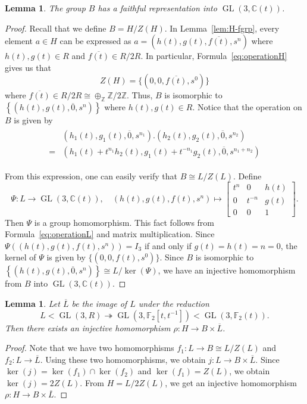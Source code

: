 \documentclass[11pt]{amsart}
\newtheorem{lem}[thm]{Lemma}
\theoremstyle{definition}
\DeclareMathOperator{\GL}{GL}
\newcommand{\ZZ}{\mathbb{Z}}
\newcommand{\CC}{\mathbb{C}}
\begin{document}
\begin{lem} \label{lem:B-linear}
 The group $B$ has a faithful representation into $\GL(3,\CC(t))$.
\end{lem}
\begin{proof}
 Recall that we define $B=H/Z(H)$.
 In Lemma~\ref{lem:H-fgrp}, every element $a \in H$ can be expressed as 
 $a=(h(t),g(t),\overline{f(t)},s^n)$ where $h(t),g(t) \in R$ and $\overline{f(t)} \in R/2R$.
  In particular, Formula~\eqref{eq:operationH} gives us that
  $$Z(H)=\{ (0,0,\overline{f(t)},s^0) \}$$
  where $\overline{f(t)} \in R/2R \cong \oplus_\ZZ \ZZ / 2\ZZ$.
  Thus, $B$ is isomorphic to $\left \{ (h(t),g(t),\overline{0},s^n) \right \}$ where $h(t),g(t) \in R$.
 Notice that the operation on $B$ is given by 
 \begin{align} \label{eq:operationB}
 \begin{split}
&(h_1(t),g_1(t),\overline{0},s^{n_1}).(h_2(t),g_2(t),\overline{0},s^{n_2}) \\
=&(h_1(t)+t^{n_1}h_2(t),g_1(t)+t^{-n_1}g_2(t),\overline{0},s^{n_1+n_2})
  \end{split}
 \end{align}
 
  From this expression, one can easily verify that $B \cong L/Z(L)$.
  Define $$\Psi:L \to \GL(3,\CC(t)), \quad (h(t),g(t),f(t),s^n) \mapsto \begin{bmatrix}
  t^n & 0 & h(t) \\ 0 & t^{-n} & g(t) \\ 0 & 0 & 1
  \end{bmatrix}.$$
  Then $\Psi$ is a group homomorphism.
  This fact follows from Formula~\eqref{eq:operationL} and matrix multiplication.
  Since $\Psi\left( (h(t),g(t),f(t),s^n) \right)=I_3$ if and only if $g(t)=h(t)=n=0$, the kernel of $\Psi$ is given by $\{ (0,0,f(t),s^0) \}$.
  Since $B$ is isomorphic to $\left \{ (h(t),g(t),\overline{0},s^n) \right \} \cong L/\ker(\Psi)$, we have an injective homomorphism from $B$ into $\GL(3,\CC(t))$.
\end{proof}

 \begin{lem} \label{lem:H into 2copy}
 Let $\overline{L}$ be the image of $L$ under the reduction
 $$ L < \GL(3,R) \twoheadrightarrow \GL(3,\mathbb{F}_2[t,t^{-1}]) < \GL(3,\mathbb{F}_2(t)). $$
 Then there exists an injective homomorphism $\rho: H \to B \times \overline{L}$.
 \end{lem}
 \begin{proof}
 Note that we have two homomorphisms $f_1:L \to B \cong L/Z(L)$ and $f_2:L \to \overline{L}$.
 Using these two homomorphisms, we obtain $j:L \to B \times \overline{L}$.
 Since $\ker(j)=\ker(f_1) \cap \ker(f_2)$ and $\ker(f_1)=Z(L)$, we obtain $\ker(j)=2Z(L)$.
 From $H=L/2Z(L)$, we get an injective homomorphism $\rho: H \to B \times \overline{L}$.
 \end{proof}
 
\end{document}
